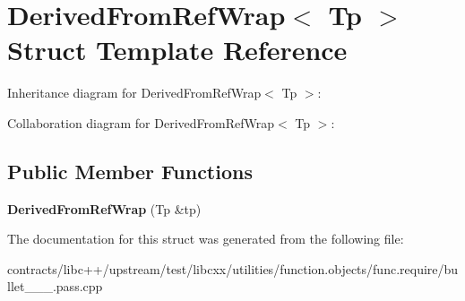 \hypertarget{struct_derived_from_ref_wrap}{}\section{Derived\+From\+Ref\+Wrap$<$ Tp $>$ Struct Template Reference}
\label{struct_derived_from_ref_wrap}


Inheritance diagram for Derived\+From\+Ref\+Wrap$<$ Tp $>$\+:


Collaboration diagram for Derived\+From\+Ref\+Wrap$<$ Tp $>$\+:
\subsection*{Public Member Functions}
\begin{DoxyCompactItemize}
\item 
\mbox{\label{struct_derived_from_ref_wrap_a144674e6e4577520c8aae1cb4f625b56}} 
{\bfseries Derived\+From\+Ref\+Wrap} (Tp \&tp)
\end{DoxyCompactItemize}


The documentation for this struct was generated from the following file\+:\begin{DoxyCompactItemize}
\item 
contracts/libc++/upstream/test/libcxx/utilities/function.\+objects/func.\+require/bullet\+\_\+\_\+\_.\+pass.\+cpp\end{DoxyCompactItemize}
